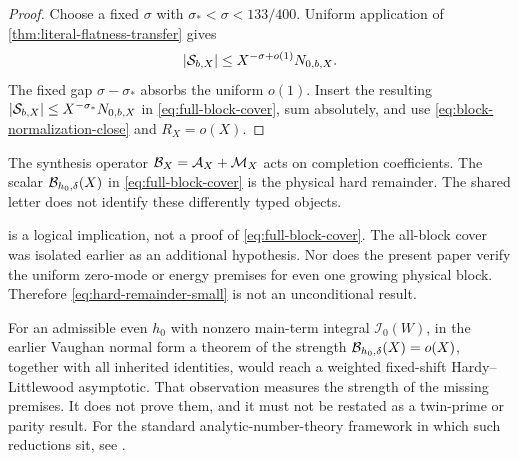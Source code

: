 \begin{proof}
Choose a fixed
\(\sigma\) with
\(\sigma_*<\sigma<133/400\).
Uniform application of
\cref{thm:literal-flatness-transfer} gives
\[
 |\mathcal S_{b,X}|
 \le X^{-\sigma+o(1)}N_{0,b,X}.
\]
The fixed gap \(\sigma-\sigma_*\) absorbs the uniform \(o(1)\).
Insert the resulting
\(|\mathcal S_{b,X}|\le X^{-\sigma_*}N_{0,b,X}\) in
\eqref{eq:full-block-cover}, sum absolutely, and use
\eqref{eq:block-normalization-close} and \(R_X=o(X)\).
\end{proof}

\begin{remark}
The synthesis operator \(\mathcal B_X=\mathcal A_X+\mathcal M_X\) acts on completion
coefficients.  The scalar \(\mathcal B_{h_0,\delta}(X)\) in
\eqref{eq:full-block-cover} is the physical hard remainder.  The
shared letter does not identify these differently typed objects.
\end{remark}

\begin{remark}
 is a logical implication, not a proof
of \eqref{eq:full-block-cover}.  The all-block cover was isolated
earlier as an additional hypothesis.  Nor does the present paper
verify the uniform zero-mode or energy premises for even one growing
physical block.  Therefore \eqref{eq:hard-remainder-small} is not an
unconditional result.
\end{remark}

\begin{remark}
For an admissible even \(h_0\) with nonzero main-term integral
\(\mathcal I_0(W)\), in the earlier Vaughan normal form a theorem of
the strength
\(\mathcal B_{h_0,\delta}(X)=o(X)\), together with all inherited identities,
would reach a weighted fixed-shift Hardy--Littlewood asymptotic.
That observation measures the strength of the missing premises.  It
does not prove them, and it must not be restated as a twin-prime or
parity result.  For the standard analytic-number-theory framework in
which such reductions sit, see \citet{IwaniecKowalski2004}.
\end{remark}
